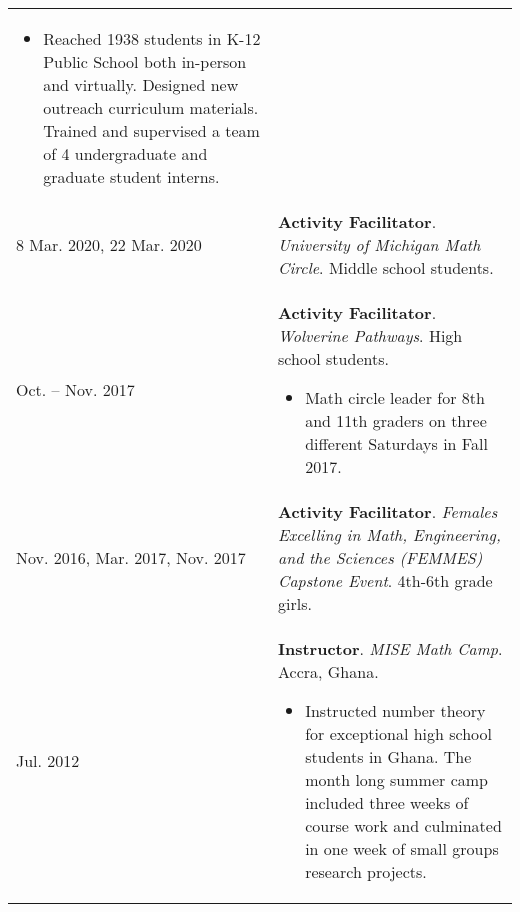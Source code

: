 \begin{center}
{\begin{longtable}{p{}  p{}}
        {\small
        \begin{itemize}
        \setlength{\parindent}{0em}
        \item[] Reached 1938 students in K-12 Public School both in-person and virtually. Designed new outreach curriculum materials. Trained and supervised a team of 4 undergraduate and graduate student interns.
        \end{itemize}
        }
        \vspace{-1em}
         \\ 
8 Mar.  2020, 22 Mar.  2020 & \textbf{Activity Facilitator}. \textit{University of Michigan Math Circle}.  Middle school students.  \\ 
 Oct.  --  Nov.  2017 & \textbf{Activity Facilitator}. \textit{Wolverine Pathways}.  High school students. 
        \hspace{-1em}

        {\small
        \begin{itemize}
        \setlength{\parindent}{0em}
        \item[] Math circle leader for 8th and 11th graders on three different Saturdays in Fall 2017.
        \end{itemize}
        }
        \vspace{-1em}
         \\ 
 Nov.  2016,  Mar.  2017,  Nov.  2017 & \textbf{Activity Facilitator}. \textit{Females Excelling in Math, Engineering, and the Sciences (FEMMES) Capstone Event}.  4th-6th grade girls.  \\ 
 Jul.  2012 & \textbf{Instructor}. \textit{MISE Math Camp}.  Accra, Ghana. 
        \hspace{-1em}

        {\small
        \begin{itemize}
        \setlength{\parindent}{0em}
        \item[] Instructed number theory for exceptional high school students in Ghana. The month long summer camp included three weeks of course work and culminated in one week of small groups research projects.
        \end{itemize}
        }
        \vspace{-1em}
         
    \end{longtable}
    } 
    \end{center}

    \vspace{-1em}
    
